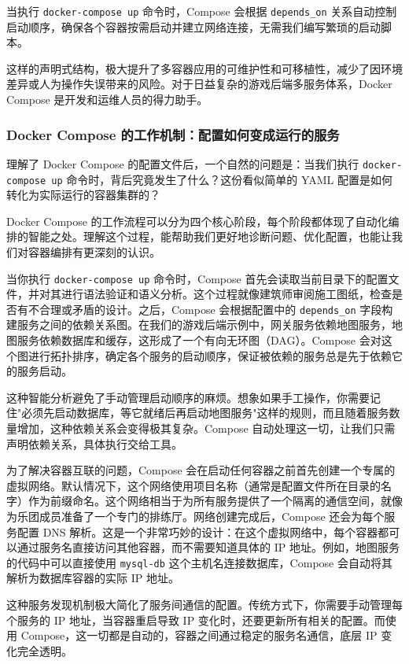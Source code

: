 当执行 \texttt{docker-compose up} 命令时，Compose 会根据 \texttt{depends\_on} 关系自动控制启动顺序，确保各个容器按需启动并建立网络连接，无需我们编写繁琐的启动脚本。

这样的声明式结构，极大提升了多容器应用的可维护性和可移植性，减少了因环境差异或人为操作失误带来的风险。对于日益复杂的游戏后端多服务体系，Docker Compose 是开发和运维人员的得力助手。


\subsubsection{Docker Compose 的工作机制：配置如何变成运行的服务}

理解了 Docker Compose 的配置文件后，一个自然的问题是：当我们执行 \texttt{docker-compose up} 命令时，背后究竟发生了什么？这份看似简单的 YAML 配置是如何转化为实际运行的容器集群的？

Docker Compose 的工作流程可以分为四个核心阶段，每个阶段都体现了自动化编排的智能之处。理解这个过程，能帮助我们更好地诊断问题、优化配置，也能让我们对容器编排有更深刻的认识。

当你执行 \texttt{docker-compose up} 命令时，Compose 首先会读取当前目录下的配置文件，并对其进行语法验证和语义分析。这个过程就像建筑师审阅施工图纸，检查是否有不合理或矛盾的设计。之后，Compose 会根据配置中的 \texttt{depends\_on} 字段构建服务之间的依赖关系图。在我们的游戏后端示例中，网关服务依赖地图服务，地图服务依赖数据库和缓存，这形成了一个有向无环图（DAG）。Compose 会对这个图进行拓扑排序，确定各个服务的启动顺序，保证被依赖的服务总是先于依赖它的服务启动。

这种智能分析避免了手动管理启动顺序的麻烦。想象如果手工操作，你需要记住"必须先启动数据库，等它就绪后再启动地图服务"这样的规则，而且随着服务数量增加，这种依赖关系会变得极其复杂。Compose 自动处理这一切，让我们只需声明依赖关系，具体执行交给工具。

为了解决容器互联的问题，Compose 会在启动任何容器之前首先创建一个专属的虚拟网络。默认情况下，这个网络使用项目名称（通常是配置文件所在目录的名字）作为前缀命名。这个网络相当于为所有服务提供了一个隔离的通信空间，就像为乐团成员准备了一个专门的排练厅。网络创建完成后，Compose 还会为每个服务配置 DNS 解析。这是一个非常巧妙的设计：在这个虚拟网络中，每个容器都可以通过服务名直接访问其他容器，而不需要知道具体的 IP 地址。例如，地图服务的代码中可以直接使用 \texttt{mysql-db} 这个主机名连接数据库，Compose 会自动将其解析为数据库容器的实际 IP 地址。

这种服务发现机制极大简化了服务间通信的配置。传统方式下，你需要手动管理每个服务的 IP 地址，当容器重启导致 IP 变化时，还要更新所有相关的配置。而使用 Compose，这一切都是自动的，容器之间通过稳定的服务名通信，底层 IP 变化完全透明。

